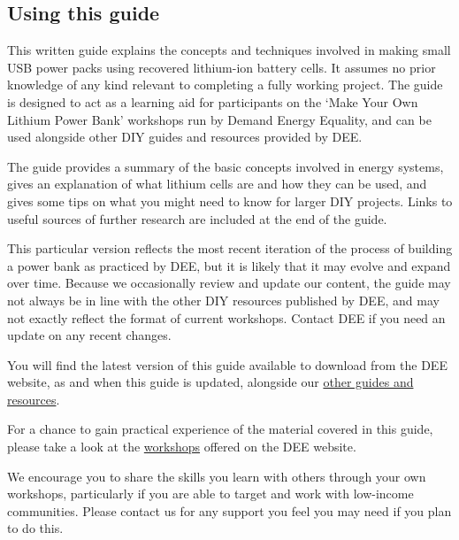 \documentclass{article}
\theoremstyle{definition}
\theoremstyle{definition}
\theoremstyle{remark}
\begin{document}
  
  \subsection{Using this guide} %
  \label{sub:using_this_guide}

    This written guide explains the concepts and techniques involved in making small USB power packs using recovered lithium-ion battery cells. It assumes no prior knowledge of any kind relevant to completing a fully working project. The guide is designed to act as a learning aid for participants on the ‘Make Your Own Lithium Power Bank’ workshops run by Demand Energy Equality, and can be used alongside other DIY guides and resources provided by DEE. 
    
    The guide provides a summary of the basic concepts involved in energy systems, gives an explanation of what lithium cells are and how they can be used, and gives some tips on what you might need to know for larger DIY projects. Links to useful sources of further research are included at the end of the guide.
    
    This particular version reflects the most recent iteration of the process of building a power bank as practiced by DEE, but it is likely that it may evolve and expand over time. Because we occasionally review and update our content, the guide may not always be in line with the other DIY resources published by DEE, and may not exactly reflect the format of current workshops. Contact DEE if you need an update on any recent changes. 
    
    You will find the latest version of this guide available to download from the DEE website, as and when this guide is updated, alongside our \href{https://www.demandenergyequality.org/resources/}{other guides and resources}.
    
    For a chance to gain practical experience of the material covered in this guide, please take a look at the \href{https://www.demandenergyequality.org/our-workshops/}{workshops} offered on the DEE website.
    
    We encourage you to share the skills you learn with others through your own workshops, particularly if you are able to target and work with low-income communities. Please contact us for any support you feel you may need if you plan to do this.
  
  
\end{document}
